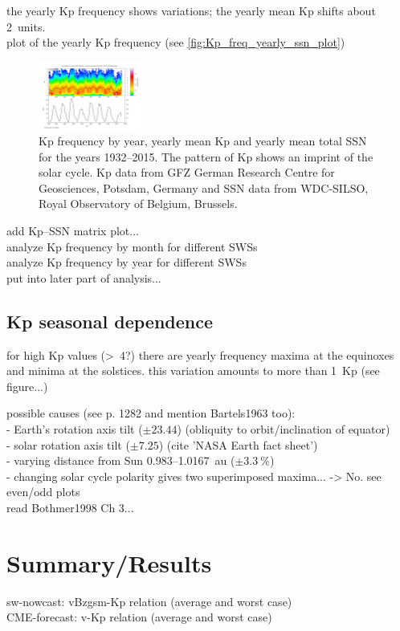 the yearly Kp frequency shows variations; the yearly mean Kp shifts about 2~units.\\
plot of the yearly Kp frequency (see \autoref{fig:Kp_freq_yearly_ssn_plot})
\begin{figure}[htb]
	\centering
	\includegraphics[width=0.3\textwidth]{images/gnuplots/Kp_freq_yearly_ssn_plot.png}
	\caption{Kp frequency by year, yearly mean Kp and yearly mean total SSN for the years 1932--2015. The pattern of Kp shows an imprint of the solar cycle. Kp data from GFZ German Research Centre for Geosciences, Potsdam, Germany and SSN data from WDC-SILSO, Royal Observatory of Belgium, Brussels.}
	\label{fig:Kp_freq_yearly_ssn_plot}
\end{figure}
add Kp--SSN matrix plot...\\

analyze Kp frequency by month for different SWSs\\
analyze Kp frequency by year for different SWSs\\
put into later part of analysis...

\subsection{Kp seasonal dependence}
for high Kp values (>~4?) there are yearly frequency maxima at the equinoxes and minima at the solstices. this variation amounts to more than 1~Kp (see figure...)

possible causes (see \citet{Rangarajan1997} p. 1282 and mention Bartels1963 too):\\
- Earth's rotation axis tilt ($\pm23.44$\textdegree) (obliquity to orbit/inclination of equator)\\
- solar rotation axis tilt ($\pm7.25$\textdegree) (cite 'NASA Earth fact sheet')\\
- varying distance from Sun 0.983--1.0167~au ($\pm3.3~\%$)\\
- changing solar cycle polarity gives two superimposed maxima... -> No. see even/odd plots\\

read Bothmer1998 Ch 3...\\


\section{Summary/Results}
sw-nowcast: vBzgsm-Kp relation (average and worst case)\\
CME-forecast: v-Kp relation (average and worst case)\\

